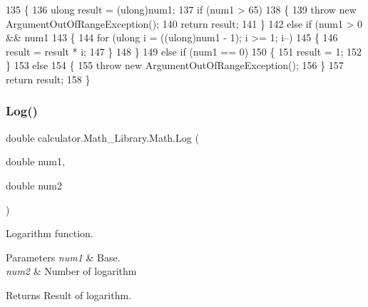 \begin{DoxyCode}
135         \{
136             ulong result = (ulong)num1;
137             \textcolor{keywordflow}{if} (num1 > 65)
138             \{
139                 \textcolor{keywordflow}{throw} \textcolor{keyword}{new} ArgumentOutOfRangeException();
140                 \textcolor{keywordflow}{return} result;
141             \}
142             \textcolor{keywordflow}{else} \textcolor{keywordflow}{if} (num1 > 0 && num1 %
143             \{
144                 \textcolor{keywordflow}{for} (ulong i = ((ulong)num1 - 1); i >= 1; i--)
145                 \{
146                     result = result * i;
147                 \}
148             \}
149             \textcolor{keywordflow}{else} \textcolor{keywordflow}{if} (num1 == 0)
150             \{
151                 result = 1;
152             \}
153             \textcolor{keywordflow}{else}
154             \{
155                 \textcolor{keywordflow}{throw} \textcolor{keyword}{new} ArgumentOutOfRangeException();
156             \}            
157             \textcolor{keywordflow}{return} result;
158         \}
\end{DoxyCode}
\mbox{\label{classcalculator_1_1_math___library_1_1_math_a64b9fca55fb3d71f14a182623e69dd68}} 
\subsubsection{Log()}
{\footnotesize\ttfamily double calculator.\+Math\+\_\+\+Library.\+Math.\+Log (\begin{DoxyParamCaption}\item[{double}]{num1,  }\item[{double}]{num2 }\end{DoxyParamCaption})}



Logarithm function. 


\begin{DoxyParams}{Parameters}
{\em num1} & Base.\\
\hline
{\em num2} & Number of logarithm\\
\hline
\end{DoxyParams}
\begin{DoxyReturn}{Returns}
Result of logarithm.
\end{DoxyReturn}


